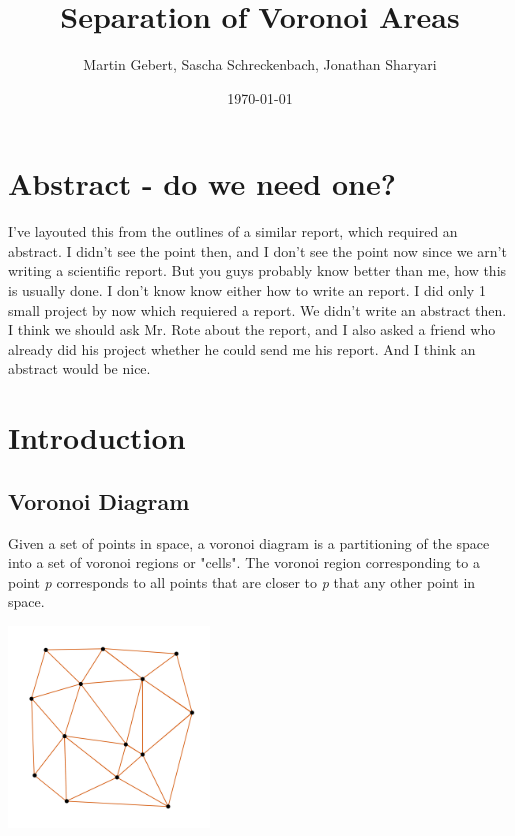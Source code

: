 \documentclass[a4paper,12pt]{article}
\title{\textbf{Separation of Voronoi Areas}}
\author{Martin Gebert, Sascha Schreckenbach, Jonathan Sharyari}  %
\date{\today}
\begin{document}
\maketitle

\section{Abstract - do we need one?}
I've layouted this from the outlines of a similar report, which required an abstract. I didn't see the point then, and I don't see the point now since we arn't writing a scientific report. But you guys probably know better than me, how this is usually done.
I don't know know either how to write an report. I did only 1 small project by now which requiered a report. We didn't write an abstract then. I think we should ask Mr. Rote about the report, and I also asked a friend who already did his project whether he could send me his report. And I think an abstract would be nice.

\section{Introduction}
\subsection{Voronoi Diagram}
Given a set of points in space, a voronoi diagram is a partitioning of the space into a set of voronoi regions or "cells". The voronoi region corresponding to a point \emph{p} corresponds to all points that are closer to \emph{p} that any other point in space.

\includegraphics[width=0.4\textwidth]{pictures/Delaunay-Triangulation1.png}
\end{document}
